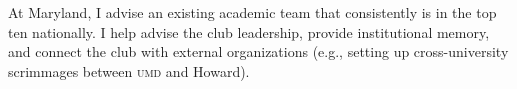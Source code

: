 \documentclass[11pt]{amsart}
\newcommand{\abr}[1]{\textsc{#1}}
\begin{document}
At Maryland, I advise an existing academic team that
consistently is in the top ten nationally.
%
I help advise the club leadership, provide institutional memory, and
connect the club with external organizations (e.g., setting up
cross-university scrimmages between \abr{umd} and Howard).






%
%
\end{document}
